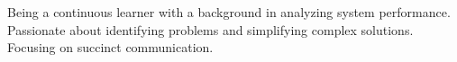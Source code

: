 

\begin{cvparagraph}

Being a continuous learner with a background in analyzing system performance.
Passionate about identifying problems and simplifying complex solutions.
Focusing on succinct communication.
%
%
\end{cvparagraph}
